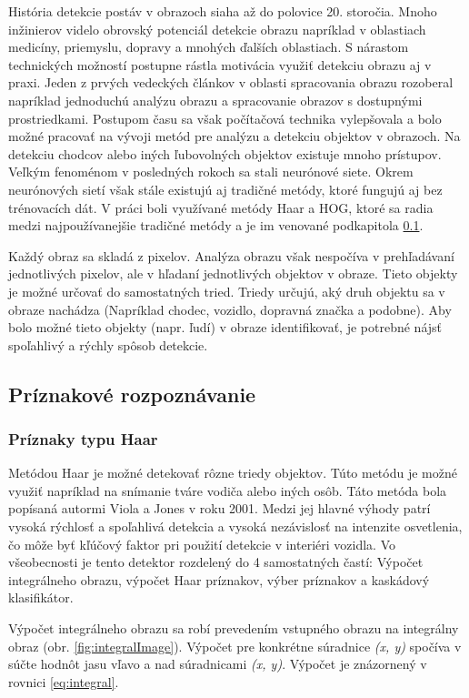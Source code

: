 \documentclass[slovak,master,dept460,male,cpp,cpdeclaration]{diploma}
\begin{document}
História detekcie postáv v obrazoch siaha až do polovice 20. storočia. Mnoho inžinierov videlo obrovský potenciál detekcie obrazu napríklad v oblastiach medicíny, priemyslu, dopravy a mnohých ďalších oblastiach. S nárastom technických možností postupne rástla motivácia využiť detekciu obrazu aj v praxi. Jeden z prvých vedeckých článkov v oblasti spracovania obrazu \cite{rosenfeld1969} rozoberal napríklad jednoduchú analýzu  obrazu a spracovanie obrazov s dostupnými prostriedkami.  Postupom času sa však počítačová technika vylepšovala a bolo možné pracovať na vývoji metód pre analýzu  a detekciu objektov v obrazoch. Na detekciu chodcov alebo iných ľubovolných objektov existuje mnoho prístupov. Veľkým fenoménom v posledných rokoch sa stali neurónové siete. Okrem neurónových sietí však stále existujú aj tradičné metódy, ktoré fungujú aj bez trénovacích dát. V práci boli využívané metódy Haar a HOG, ktoré sa radia medzi najpoužívanejšie tradičné metódy a je im venované podkapitola \ref{Príznakové rozpoznávanie}.\par
Každý obraz sa skladá z pixelov. Analýza obrazu však nespočíva v prehľadávaní jednotlivých pixelov, ale v hľadaní jednotlivých objektov v obraze. Tieto objekty je možné  určovať do  samostatných tried. Triedy určujú, aký druh objektu sa v obraze nachádza (Napríklad chodec, vozidlo, dopravná značka a podobne). Aby bolo možné tieto objekty (napr. ľudí) v obraze identifikovať, je potrebné nájsť spoľahlivý a rýchly spôsob detekcie. 


\subsection{Príznakové rozpoznávanie}
\label{Príznakové rozpoznávanie}
\subsubsection*{Príznaky typu Haar}
Metódou Haar je možné detekovať rôzne triedy objektov. Túto metódu je možné využiť napríklad na snímanie tváre vodiča alebo iných osôb. Táto metóda bola popísaná autormi Viola a Jones\cite{viola2001rapid} v roku 2001. Medzi jej hlavné výhody patrí vysoká rýchlosť  a spoľahlivá detekcia a vysoká nezávislosť na intenzite osvetlenia, čo môže byť kľúčový faktor pri použití detekcie v interiéri vozidla. Vo všeobecnosti je tento detektor rozdelený do 4 samostatných častí: Výpočet integrálneho obrazu,  výpočet Haar príznakov, výber príznakov a kaskádový klasifikátor.\par Výpočet integrálneho obrazu sa robí prevedením vstupného obrazu na integrálny obraz (obr. \ref{fig:integralImage}). Výpočet pre konkrétne súradnice \textit{(x, y)} spočíva v súčte hodnôt jasu vľavo a nad súradnicami  \textit{(x, y)}. Výpočet je znázornený v rovnici \ref{eq:integral}.
\end{document}
